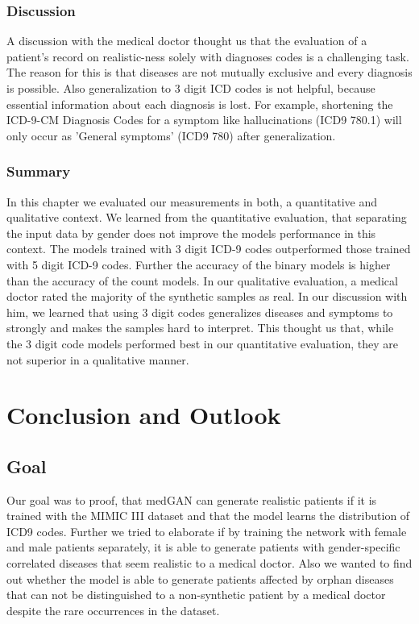 \documentclass[11pt, a4paper]{book}
\begin{document}
\subsection{Discussion}
A discussion with the medical doctor thought us that the evaluation of a patient's record on realistic-ness solely with diagnoses codes is a challenging task. The reason for this is that diseases are not mutually exclusive and every diagnosis is possible. Also generalization to 3 digit ICD codes is not helpful, because essential information about each diagnosis is lost. For example, shortening the ICD-9-CM Diagnosis Codes for a symptom like hallucinations (ICD9 780.1) will only occur as 'General symptoms' (ICD9 780) after generalization. 

\subsection{Summary}
In this chapter we evaluated our measurements in both, a quantitative and qualitative context. We learned from the quantitative evaluation, that separating the input data by gender does not improve the models performance in this context. The models trained with 3 digit ICD-9 codes outperformed those trained with 5 digit ICD-9 codes. Further the accuracy of the binary models is higher than the accuracy of the count models.
In our qualitative evaluation, a medical doctor rated the majority of the synthetic samples as real. In our discussion with him, we learned that using 3 digit codes generalizes diseases and symptoms to strongly and makes the samples hard to interpret.
This thought us that, while the 3 digit code models performed best in our quantitative evaluation, they are not superior in a qualitative manner.
\chapter{Conclusion and Outlook}
\section{Goal}
Our goal was to proof, that medGAN can generate realistic patients if it is trained with the MIMIC III dataset and that the model learns the distribution of ICD9 codes. Further we tried to elaborate if by training the network with female and male patients separately, it is able to generate patients with gender-specific correlated diseases that seem realistic to a medical doctor. Also we wanted to find out whether the model is able to generate patients affected by orphan diseases that can not be distinguished to a non-synthetic patient by a medical doctor despite the rare occurrences in the dataset.
\end{document}
